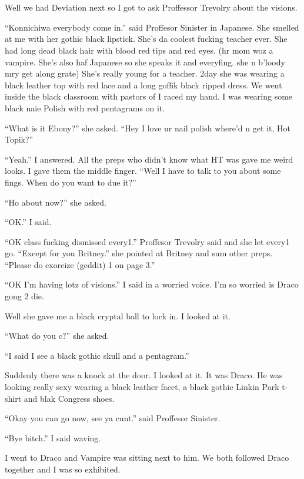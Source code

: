 \section{}



Well we had Deviation next so I got to ask Proffessor Trevolry about the visions.

\enquote{Konnichiwa everybody come in.} said Proffesor Sinister in Japanese. She smelled at me with her gothic black lipstick. She's da coolest fucking teacher ever. She had long dead black hair with blood red tips and red eyes. (hr mom woz a vampire. She's also haf Japanese so she speaks it and everyfing. she n b'loody mry get along grate) She's really young for a teacher. 2day she was wearing a black leather top with red lace and a long goffik black ripped dress. We went inside the black classroom with pastors of  I raced my hand. I was wearing some black naie Polish with red pentagrams on it.

\enquote{What is it Ebony?} she asked. \enquote{Hey I love ur nail polish where'd u get it, Hot Topik?}

\enquote{Yeah.} I answered. All the preps who didn't know what HT was gave me weird looks. I gave them the middle finger. \enquote{Well I have to talk to you about some fings. When do you want to due it?}

\enquote{Ho about now?} she asked.

\enquote{OK.} I said.

\enquote{OK class fucking dismissed every1.} Proffesor Trevolry said and she let every1 go. \enquote{Except for you Britney.} she pointed at Britney and sum other preps. \enquote{Please do exorcize (geddit) 1 on page 3.}

\enquote{OK I'm having lotz of visions.} I said in a worried voice. I'm so worried is Draco gong 2 die.

Well she gave me a black cryptal ball to lock in. I looked at it.

\enquote{What do you c?} she asked.

\enquote{I said I see a black gothic skull and a pentagram.}

Suddenly there was a knock at the door. I looked at it. It was Draco. He was looking really sexy wearing a black leather facet, a black gothic Linkin Park t-shirt and blak Congress shoes.

\enquote{Okay you can go now, see ya cunt.} said Proffesor Sinister.

\enquote{Bye bitch.} I said waving.

I went to Draco and Vampire was sitting next to him. We both followed Draco together and I was so exhibited.

